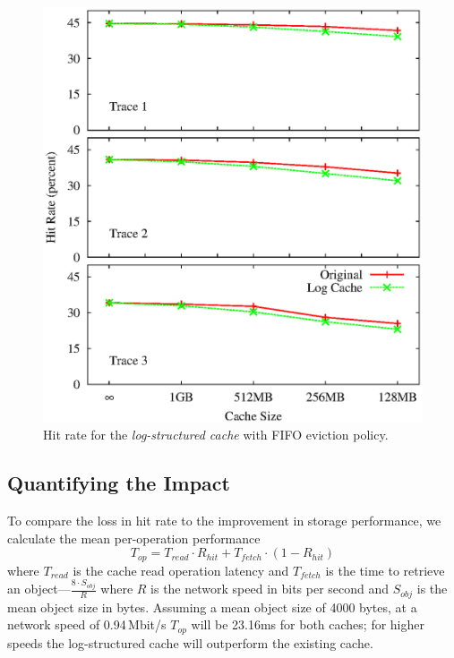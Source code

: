 \documentclass{sig-alternate}
\begin{document}
\begin{figure}[t]
  \begin{center}
    \includegraphics[width=1.04\columnwidth]{graphs/hit-rate-2}
  \end{center}
  \caption{Hit rate for the \emph{log-structured cache} with FIFO eviction
    policy.}
  \label{fig:hit-rate} 
\vspace{-0.2in}
\end{figure}

\subsection{Quantifying the Impact}
To compare the loss in hit rate to the improvement in storage performance, we
calculate the mean per-operation performance
\begin{equation}
T_{op} = T_{read}\cdot R_{hit} + T_{fetch}\cdot (1-R_{hit})
\end{equation}
where $T_{read}$ is the cache read operation latency and $T_{fetch}$ is the time
to retrieve an object---$\frac{8\cdot S_{obj}}{R}$ where $R$ is the network
speed in bits per second and $S_{obj}$ is the mean object size in bytes.
Assuming a mean object size of 4000 bytes, at a network speed of 0.94\,Mbit/s
$T_{op}$ will be 23.16ms for both caches; for higher speeds the log-structured
cache will outperform the existing cache.
\end{document}
